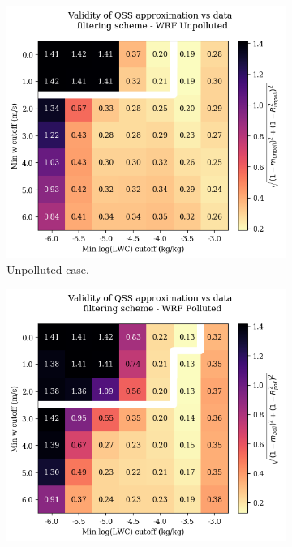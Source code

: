 \documentclass{article}
\begin{document}
\begin{figure}[ht]
	\centering
	\begin{subfigure}{0.7\textwidth}
		\includegraphics[width=\textwidth]{wrf/filtering_criteria_separate_Unpolluted_figure.png}
		\caption{Unpolluted case.}
		\label{filtcritheatmapsepunpoll}
	\end{subfigure}
	\begin{subfigure}{0.7\textwidth}
		\includegraphics[width=\textwidth]{wrf/filtering_criteria_separate_Polluted_figure.png}

\end{subfigure}
\end{figure}
\end{document}
